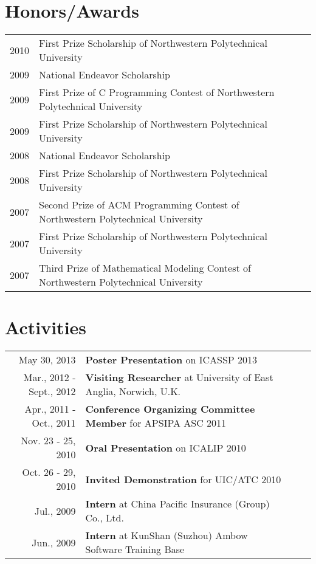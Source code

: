 \documentclass[10pt]{article}
\begin{document}

\vspace{0.8em}
\section{Honors/Awards}
\begin{tabularx}{\textwidth}{@{}r|X l|p{4.9cm}@{}}
2010 & First Prize Scholarship of Northwestern Polytechnical University \\
2009 & National Endeavor Scholarship \\
2009 & First Prize of C Programming Contest of Northwestern Polytechnical University \\
2009 & First Prize Scholarship of Northwestern Polytechnical University \\
2008 & National Endeavor Scholarship \\
2008 & First Prize Scholarship of Northwestern Polytechnical University \\
2007 & Second Prize of ACM Programming Contest of Northwestern Polytechnical University \\
2007 & First Prize Scholarship of Northwestern Polytechnical University \\
2007 & Third Prize of Mathematical Modeling Contest of Northwestern Polytechnical University
\end{tabularx}




\vspace{0.8em}
\section{Activities}
\begin{tabularx}{\textwidth}{@{}r|X l|p{4.9cm}@{}}
May 30, 2013             &  \textbf{Poster Presentation} on ICASSP 2013 \\
Mar., 2012 - Sept., 2012 &  \textbf{Visiting Researcher} at University of East Anglia, Norwich, U.K. \\
Apr., 2011 - Oct., 2011  &  \textbf{Conference Organizing Committee Member} for APSIPA ASC 2011 \\
Nov. 23 - 25, 2010       &  \textbf{Oral Presentation} on ICALIP 2010 \\
Oct. 26 - 29, 2010       &  \textbf{Invited Demonstration} for UIC/ATC 2010 \\
Jul., 2009               &  \textbf{Intern} at China Pacific Insurance (Group) Co., Ltd. \\
Jun., 2009               &  \textbf{Intern} at KunShan (Suzhou) Ambow Software Training Base
\end{tabularx}
\end{document}
